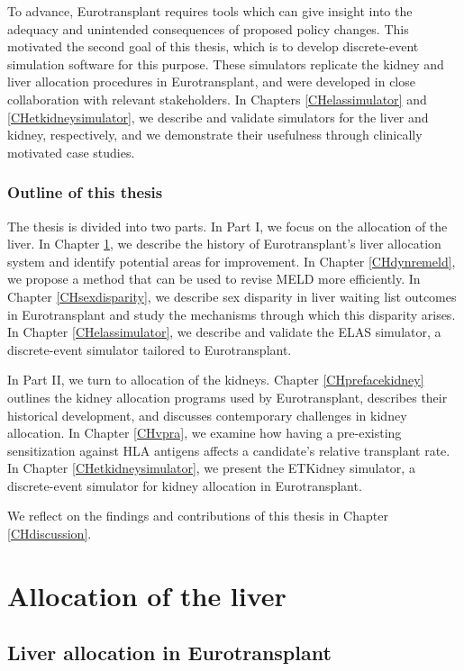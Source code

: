 \documentclass[11pt,twoside,]{book}
\begin{document}
To advance, Eurotransplant requires tools which can give
insight into the adequacy and unintended consequences of proposed policy changes.
This motivated the second goal of this thesis, which is to develop
discrete-event simulation software for this purpose. These simulators replicate the kidney and liver
allocation procedures in Eurotransplant, and were developed in close
collaboration with relevant stakeholders. In Chapters \ref{CHelassimulator}
and \ref{CHetkidneysimulator}, we describe and validate simulators for the
liver and kidney, respectively, and we demonstrate their usefulness through
clinically motivated case studies.

\section{Outline of this thesis}\label{outline-of-this-thesis}

The thesis is divided into two parts. In Part I, we focus on the allocation of the
liver. In Chapter \ref{CHprefaceliver}, we describe the history of
Eurotransplant's liver allocation system and identify potential areas for improvement.
In Chapter \ref{CHdynremeld}, we propose a method that can be used
to revise MELD more efficiently. In Chapter \ref{CHsexdisparity}, we describe
sex disparity in liver waiting list outcomes in Eurotransplant and study the mechanisms
through which this disparity arises. In Chapter \ref{CHelassimulator},
we describe and validate the ELAS simulator, a discrete-event simulator
tailored to Eurotransplant.

In Part II, we turn to allocation of the kidneys. Chapter \ref{CHprefacekidney}
outlines the kidney allocation programs used by Eurotransplant, describes their historical
development, and discusses contemporary challenges in kidney allocation. In Chapter
\ref{CHvpra}, we examine how having a pre-existing sensitization against HLA
antigens affects a candidate's relative transplant rate. In Chapter \ref{CHetkidneysimulator},
we present the ETKidney simulator, a discrete-event simulator for kidney
allocation in Eurotransplant.

We reflect on the findings and contributions of this thesis in Chapter
\ref{CHdiscussion}.

\part{Allocation of the liver}

\chapter{Liver allocation in Eurotransplant}\label{CHprefaceliver}
\end{document}
